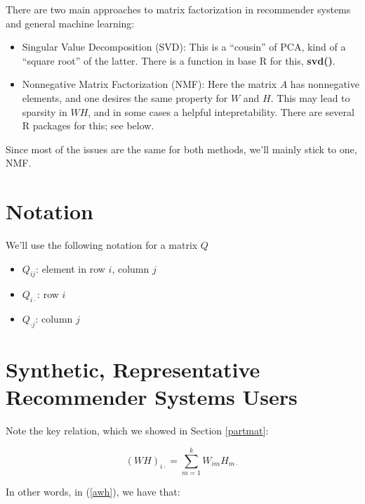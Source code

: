 There are two main approaches to matrix factorization in recommender
systems and general machine learning:

\begin{itemize}

\item Singular Value Decomposition (SVD):  This is a ``cousin'' of PCA,
kind of a ``square root'' of the latter.  There is a function in base R
for this, \textbf{svd()}.

\item Nonnegative Matrix Factorization (NMF): Here the matrix $A$ has
nonnegative elements, and one desires the same property for $W$ and $H$.
This may lead to sparsity in $WH$, and in some cases a helpful
intepretability.  There are several R packages for this; see below.

\end{itemize} 

Since most of the issues are the same for both methods, we'll mainly stick
to one, NMF.

\section{Notation}

We'll use the following notation for a matrix $Q$

\begin{itemize}

\item $Q_{ij}$:  element in row $i$, column $j$

\item $Q_{i \cdot}$:  row $i$

\item $Q_{\cdot j}$:  column $j$

\end{itemize}

\section{Synthetic, Representative Recommender Systems Users}
\label{synth}

Note the key relation, which we showed in Section \ref{partmat}:

\begin{equation}
(WH)_{i \cdot} = \sum_{m=1}^k W_{im} H_{m \cdot}
\end{equation}

In other words, in (\ref{awh}), we have that:

